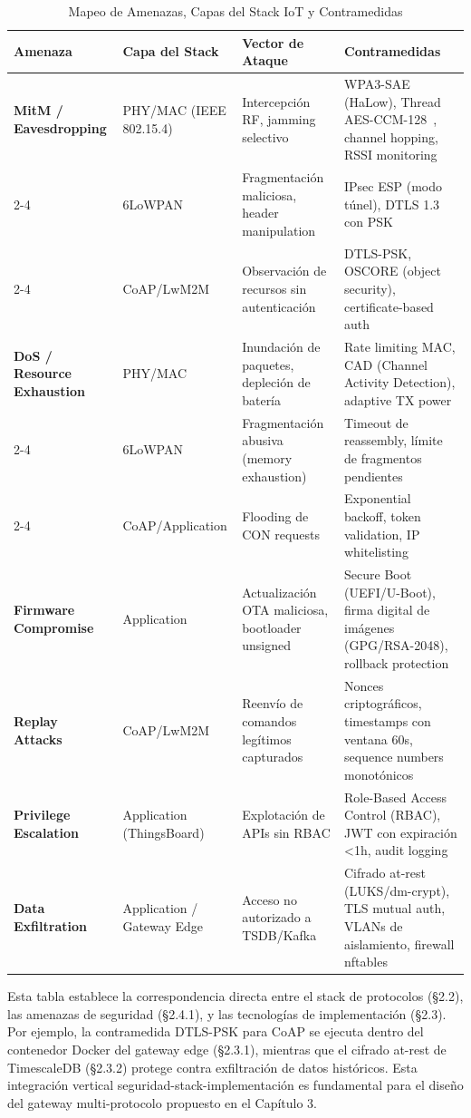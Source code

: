 \begin{table}[h]
\centering
\caption{Mapeo de Amenazas, Capas del Stack IoT y Contramedidas}
\label{tab:security-stack-mapping}
\begin{tabular}{|p{3cm}|p{2.5cm}|p{4cm}|p{4.5cm}|}
\hline
\textbf{Amenaza} & \textbf{Capa del Stack} & \textbf{Vector de Ataque} & \textbf{Contramedidas} \\
\hline
\textbf{MitM / Eavesdropping} & PHY/MAC (IEEE 802.15.4) & Intercepción RF, jamming selectivo & WPA3-SAE (HaLow), Thread AES-CCM-128~\cite{ThreadGroup2023}, channel hopping, RSSI monitoring \\
\cline{2-4}
& 6LoWPAN & Fragmentación maliciosa, header manipulation & IPsec ESP (modo túnel), DTLS 1.3 con PSK \\
\cline{2-4}
& CoAP/LwM2M & Observación de recursos sin autenticación & DTLS-PSK, OSCORE (object security), certificate-based auth \\
\hline
\textbf{DoS / Resource Exhaustion} & PHY/MAC & Inundación de paquetes, depleción de batería & Rate limiting MAC, CAD (Channel Activity Detection), adaptive TX power \\
\cline{2-4}
& 6LoWPAN & Fragmentación abusiva (memory exhaustion) & Timeout de reassembly, límite de fragmentos pendientes \\
\cline{2-4}
& CoAP/Application & Flooding de CON requests & Exponential backoff, token validation, IP whitelisting \\
\hline
\textbf{Firmware Compromise} & Application & Actualización OTA maliciosa, bootloader unsigned & Secure Boot (UEFI/U-Boot), firma digital de imágenes (GPG/RSA-2048), rollback protection \\
\hline
\textbf{Replay Attacks} & CoAP/LwM2M & Reenvío de comandos legítimos capturados & Nonces criptográficos, timestamps con ventana 60s, sequence numbers monotónicos \\
\hline
\textbf{Privilege Escalation} & Application (ThingsBoard) & Explotación de APIs sin RBAC & Role-Based Access Control (RBAC), JWT con expiración <1h, audit logging \\
\hline
\textbf{Data Exfiltration} & Application / Gateway Edge & Acceso no autorizado a TSDB/Kafka & Cifrado at-rest (LUKS/dm-crypt), TLS mutual auth, VLANs de aislamiento, firewall nftables \\
\hline
\end{tabular}
\end{table}

Esta tabla establece la correspondencia directa entre el stack de protocolos (§2.2), las amenazas de seguridad (§2.4.1), y las tecnologías de implementación (§2.3). Por ejemplo, la contramedida DTLS-PSK para CoAP se ejecuta dentro del contenedor Docker del gateway edge (§2.3.1), mientras que el cifrado at-rest de TimescaleDB (§2.3.2) protege contra exfiltración de datos históricos. Esta integración vertical seguridad-stack-implementación es fundamental para el diseño del gateway multi-protocolo propuesto en el Capítulo 3.

